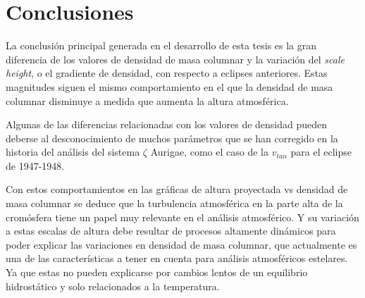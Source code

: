 \documentclass[12pt,oneside,openany,letter]{book}
\begin{document}

\chapter{Conclusiones}\label{conclusiones}

La conclusión principal generada en el desarrollo de esta tesis es la gran diferencia de los valores de densidad de masa columnar y la variación del \textit{scale height}, o el gradiente de densidad, con respecto a eclipses anteriores. Estas magnitudes siguen el mismo comportamiento en el que la densidad de masa columnar disminuye a medida que aumenta la altura atmosférica. 

Algunas de las diferencias relacionadas con los valores de densidad pueden deberse al desconocimiento de muchos parámetros que se han corregido en la historia del análisis del sistema $\zeta$ Aurigae, como el caso de la $v_{tan}$ para el eclipse de 1947-1948.

Con estos comportamientos en las gráficas de altura proyectada vs densidad de masa columnar se deduce  que la turbulencia atmosférica en la parte alta de la cromósfera tiene un papel muy relevante en el análisis atmosférico. Y su variación a estas escalas de altura debe resultar de procesos altamente dinámicos para poder explicar las variaciones en densidad de masa columnar, que actualmente es una de las características a tener en cuenta para análisis atmosféricos estelares. Ya que estas no pueden explicarse por cambios lentos de un equilibrio hidrostático y solo relacionados a la temperatura.
\end{document}
